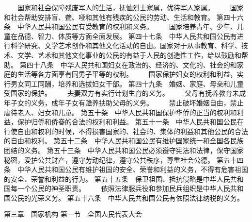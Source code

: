 　　国家和社会保障残废军人的生活，抚恤烈士家属，优待军人家属。
　　国家和社会帮助安排盲、聋、哑和其他有残疾的公民的劳动、生活和教育。
     第四十六条　中华人民共和国公民有受教育的权利和义务。
　　国家培养青年、少年、儿童在品德、智力、体质等方面全面发展。
     第四十七条　中华人民共和国公民有进行科学研究、文学艺术创作和其他文化活动的自由。国家对于从事教育、科学、技术、文学、艺术和其他文化事业的公民的有益于人民的创造性工作，给以鼓励和帮助。
     第四十八条　中华人民共和国妇女在政治的、经济的、文化的、社会的和家庭的生活等各方面享有同男子平等的权利。
　　国家保护妇女的权利和利益，实行男女同工同酬，培养和选拔妇女干部。
     第四十九条　婚姻、家庭、母亲和儿童受国家的保护。
　　夫妻双方有实行计划生育的义务。
　　父母有抚养教育未成年子女的义务，成年子女有赡养扶助父母的义务。
　　禁止破坏婚姻自由，禁止虐待老人、妇女和儿童。
     第五十条　中华人民共和国保护华侨的正当的权利和利益，保护归侨和侨眷的合法的权利和利益。
     第五十一条　中华人民共和国公民在行使自由和权利的时候，不得损害国家的、社会的、集体的利益和其他公民的合法的自由和权利。
     第五十二条　中华人民共和国公民有维护国家统一和全国各民族团结的义务。
     第五十三条　中华人民共和国公民必须遵守宪法和法律，保守国家秘密，爱护公共财产，遵守劳动纪律，遵守公共秩序，尊重社会公德。
     第五十四条　中华人民共和国公民有维护祖国的安全、荣誉和利益的义务，不得有危害祖国的安全、荣誉和利益的行为。
     第五十五条　保卫祖国、抵抗侵略是中华人民共和国每一个公民的神圣职责。
　　依照法律服兵役和参加民兵组织是中华人民共和国公民的光荣义务。
     第五十六条　中华人民共和国公民有依照法律纳税的义务。
     
第三章　国家机构
第一节　全国人民代表大会

